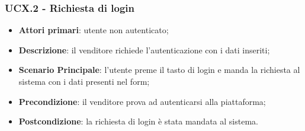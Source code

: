 \subsubsection{UCX.2 - Richiesta di login}
\begin{itemize}
\item \textbf{Attori primari}: utente non autenticato;
\item \textbf{Descrizione}: il venditore richiede l'autenticazione con i dati inseriti;
\item \textbf{Scenario Principale}: l'utente preme il tasto di login e manda la richiesta al sistema con i dati presenti nel form;
\item \textbf{Precondizione}: il venditore prova ad autenticarsi alla piattaforma;
\item \textbf{Postcondizione}: la richiesta di login è stata mandata al sistema.
\end{itemize} 